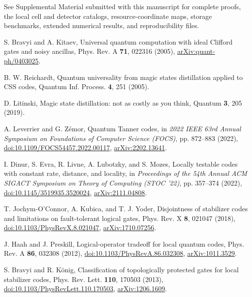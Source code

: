 See Supplemental Material submitted with this manuscript for complete proofs, the local cell and detector catalogs, resource-coordinate maps, storage benchmarks, extended numerical results, and reproducibility files.

S. Bravyi and A. Kitaev, Universal quantum computation with ideal Clifford gates and noisy ancillas, Phys. Rev. A \textbf{71}, 022316 (2005), \href{https://arxiv.org/abs/quant-ph/0403025}{arXiv:quant-ph/0403025}.

B. W. Reichardt, Quantum universality from magic states distillation applied to CSS codes, Quantum Inf. Process. \textbf{4}, 251 (2005).

D. Litinski, Magic state distillation: not as costly as you think, Quantum \textbf{3}, 205 (2019).

A. Leverrier and G. Z\'emor, Quantum Tanner codes, in \emph{2022 IEEE 63rd Annual Symposium on Foundations of Computer Science (FOCS)}, pp. 872--883 (2022), \href{https://doi.org/10.1109/FOCS54457.2022.00117}{doi:10.1109/FOCS54457.2022.00117}, \href{https://arxiv.org/abs/2202.13641}{arXiv:2202.13641}.

I. Dinur, S. Evra, R. Livne, A. Lubotzky, and S. Mozes, Locally testable codes with constant rate, distance, and locality, in \emph{Proceedings of the 54th Annual ACM SIGACT Symposium on Theory of Computing (STOC '22)}, pp. 357--374 (2022), \href{https://doi.org/10.1145/3519935.3520024}{doi:10.1145/3519935.3520024}, \href{https://arxiv.org/abs/2111.04808}{arXiv:2111.04808}.

T. Jochym-O'Connor, A. Kubica, and T. J. Yoder, Disjointness of stabilizer codes and limitations on fault-tolerant logical gates, Phys. Rev. X \textbf{8}, 021047 (2018), \href{https://doi.org/10.1103/PhysRevX.8.021047}{doi:10.1103/PhysRevX.8.021047}, \href{https://arxiv.org/abs/1710.07256}{arXiv:1710.07256}.

J. Haah and J. Preskill, Logical-operator tradeoff for local quantum codes, Phys. Rev. A \textbf{86}, 032308 (2012), \href{https://doi.org/10.1103/PhysRevA.86.032308}{doi:10.1103/PhysRevA.86.032308}, \href{https://arxiv.org/abs/1011.3529}{arXiv:1011.3529}.

S. Bravyi and R. K\"onig, Classification of topologically protected gates for local stabilizer codes, Phys. Rev. Lett. \textbf{110}, 170503 (2013), \href{https://doi.org/10.1103/PhysRevLett.110.170503}{doi:10.1103/PhysRevLett.110.170503}, \href{https://arxiv.org/abs/1206.1609}{arXiv:1206.1609}.

